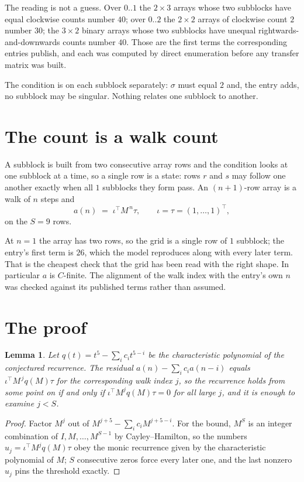 \documentclass[11pt,a4paper]{article}
\theoremstyle{plain}
\newtheorem{lemma}[theorem]{Lemma}
\theoremstyle{definition}
\begin{document}
The reading is not a guess. Over $0..1$ the $2\times3$ arrays whose two subblocks have equal
clockwise counts number $40$; over $0..2$ the $2\times2$ arrays of clockwise count $2$ number
$30$; the $3\times2$ binary arrays whose two subblocks have unequal rightwards-and-downwards
counts number $40$. Those are the first terms the corresponding entries publish, and each was
computed by direct enumeration before any transfer matrix was built.

The condition is on each subblock separately: $\sigma$ must equal $2$ and, the entry adds, no subblock may be singular. Nothing
relates one subblock to another.

\section{The count is a walk count}

A subblock is built from two consecutive array rows and the condition looks
at one subblock at a time, so a single row is a state: rows $r$ and $s$ may follow one another
exactly when all $1$ subblocks they form pass. An $(n+1)$-row array is a walk of $n$ steps and
\[
a(n)\;=\;\iota^{\!\top}M^{\,n}\tau,\qquad\iota=\tau=(1,\dots,1)^{\!\top},
\]
on the $S=9$ rows.

At $n=1$ the array has two rows, so the grid is a single row of $1$
subblock; the entry's first term is $26$, which the model
reproduces along with every later term. That is the cheapest check that the grid has been read
with the right shape.
In particular $a$ is $C$-finite. The alignment of the walk index with the entry's own $n$ was
checked against its published terms rather than assumed.

\section{The proof}

\begin{lemma}\label{lem:crit}
Let $q(t)=t^{5}-\sum_i c_it^{5-i}$ be the characteristic polynomial of the
conjectured recurrence. The residual $a(n)-\sum_ic_ia(n-i)$ equals
$\iota^{\!\top}M^{\,j}q(M)\tau$ for the corresponding walk index $j$, so the recurrence
holds from some point on if and only if $\iota^{\!\top}M^{j}q(M)\tau=0$ for all large $j$,
and it is enough to examine $j<S$.
\end{lemma}

\begin{proof}
Factor $M^{j}$ out of $M^{j+5}-\sum_ic_iM^{j+5-i}$. For the bound, $M^{S}$
is an integer combination of $I,M,\dots,M^{S-1}$ by Cayley--Hamilton, so the numbers
$u_j=\iota^{\!\top}M^{j}q(M)\tau$ obey the monic recurrence given by the characteristic
polynomial of $M$; $S$ consecutive zeros force every later one, and the last nonzero $u_j$
pins the threshold exactly.
\end{proof}
\end{document}

